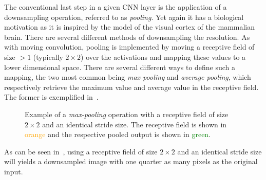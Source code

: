 The conventional last step in a given CNN layer is the application of a downsampling operation, referred to as \textit{pooling}.
Yet again it has a biological motivation as it is inspired by the model of the visual cortex of the mammalian brain.
There are several different methods of downsampling the resolution.
As with moving convolution, pooling is implemented by moving a receptive field of size $>1$ (typically $2 \times 2$) over the activations and mapping these values to a lower dimensional space.
There are several different ways to define such a mapping, the two most common being \textit{max pooling} and \textit{average pooling}, which respectively retrieve the maximum value and average value in the receptive field.
The former is exemplified in~.

\begin{figure}[htb]
  
  \caption{%
    Example of a \textit{max-pooling} operation with a receptive field of size $2 \times 2$ and an identical stride size.
    The receptive field is shown in \textcolor{orange}{orange} and the respective pooled output is shown in \textcolor{green}{green}.
  }%
  \label{fig:max-pooling}
\end{figure}

As can be seen in~, using a receptive field of size $2 \times 2$ and an identical stride size will yields a downsampled image with one quarter as many pixels as the original input.
